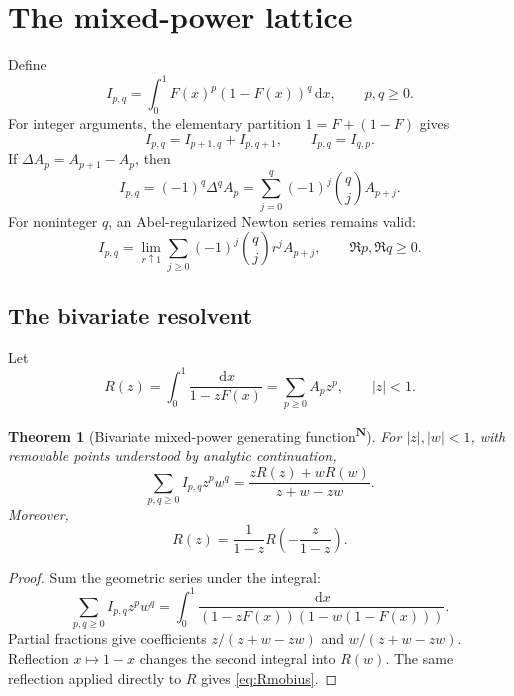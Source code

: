 \documentclass[11pt,oneside]{article}
\newtheorem{theorem}{Theorem}[section]
\theoremstyle{definition}
\theoremstyle{remark}
\newcommand{\F}{F}
\newcommand{\dd}{\,\mathrm d}
\newcommand{\tagnew}{\textsuperscript{\textcolor{oliveink}{\bfseries N}}}
\begin{document}
\section{The mixed-power lattice}

Define
\begin{equation}\label{eq:Ipq}
 I_{p,q}=\int_0^1\F(x)^p(1-\F(x))^q\dd x,
 \qquad p,q\ge0.
\end{equation}
For integer arguments, the elementary partition
\(1=\F+(1-\F)\) gives
\begin{equation}\label{eq:PascalI}
 I_{p,q}=I_{p+1,q}+I_{p,q+1},
 \qquad I_{p,q}=I_{q,p}.
\end{equation}
If \(\Delta A_p=A_{p+1}-A_p\), then
\begin{equation}\label{eq:finiteDI}
 I_{p,q}=(-1)^q\Delta^q A_p
 =\sum_{j=0}^q(-1)^j\binom qj A_{p+j}.
\end{equation}
For noninteger \(q\), an Abel-regularized Newton series remains valid:
\begin{equation}\label{eq:abelseries}
 I_{p,q}=\lim_{r\uparrow1}
 \sum_{j\ge0}(-1)^j\binom qj r^j A_{p+j},
 \qquad \Re p,\Re q\ge0.
\end{equation}

\subsection{The bivariate resolvent}

Let
\begin{equation}\label{eq:Rdef}
 R(z)=\int_0^1\frac{\dd x}{1-z\F(x)}
 =\sum_{p\ge0}A_pz^p,
 \qquad |z|<1.
\end{equation}

\begin{theorem}[Bivariate mixed-power generating function\tagnew]
For \(|z|,|w|<1\), with removable points understood by analytic continuation,
\begin{equation}\label{eq:bivgen}
 \boxed{
 \sum_{p,q\ge0}I_{p,q}z^pw^q
 =\frac{zR(z)+wR(w)}{z+w-zw}.}
\end{equation}
Moreover,
\begin{equation}\label{eq:Rmobius}
 R(z)=\frac1{1-z}R\!\left(-\frac z{1-z}\right).
\end{equation}
\end{theorem}

\begin{proof}
Sum the geometric series under the integral:
\[
 \sum_{p,q\ge0}I_{p,q}z^pw^q
 =\int_0^1\frac{\dd x}
 {(1-z\F(x))(1-w(1-\F(x)))}.
\]
Partial fractions give coefficients
\(z/(z+w-zw)\) and \(w/(z+w-zw)\).  Reflection
\(x\mapsto1-x\) changes the second integral into \(R(w)\).  The same reflection
applied directly to \(R\) gives \eqref{eq:Rmobius}.
\end{proof}
\end{document}
